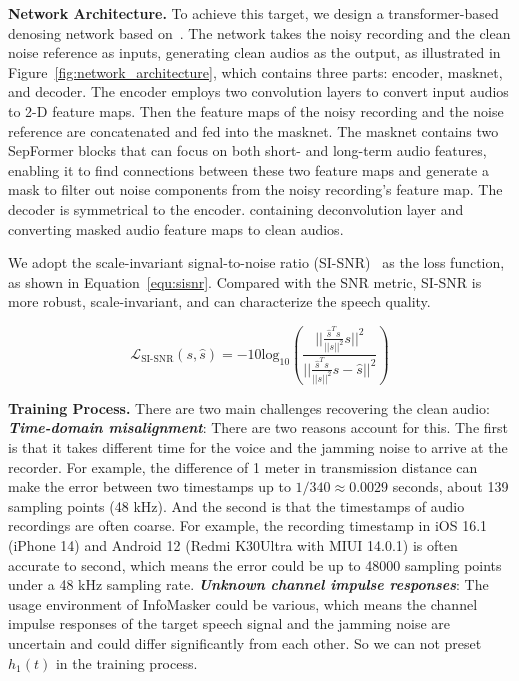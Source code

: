 \textbf{Network Architecture.} To achieve this target, we design a transformer-based denosing network based on~\cite{sepformer}. The network takes the noisy recording and the clean noise reference as inputs, generating clean audios as the output, as illustrated in Figure~\ref{fig:network_architecture}, which contains three parts: encoder, masknet, and decoder. The encoder employs two convolution layers to convert input audios to 2-D feature maps. Then the feature maps of the noisy recording and the noise reference are concatenated and fed into the masknet. The masknet contains two SepFormer blocks that can focus on both short- and long-term audio features, enabling it to find connections between these two feature maps and generate a mask to filter out noise components from the noisy recording's feature map. The decoder is symmetrical to the encoder. containing deconvolution layer and converting masked audio feature maps to clean audios.

We adopt the scale-invariant signal-to-noise ratio (SI-SNR)~\cite{si-snr} as the loss function, as shown in Equation~\ref{equ:sisnr}. Compared with the SNR metric, SI-SNR is more robust, scale-invariant, and can characterize the speech quality.

\begin{equation}
    \mathcal{L}_{\text{SI-SNR}}(s, \hat{s}) = -10 \text{log}_{10} \left( \frac{||\frac{\hat{s}^T s}{||s||^2}s||^2}{||\frac{\hat{s}^T s}{||s||^2}s - \hat{s}||^2} \right)
    \label{equ:sisnr}
\end{equation}

\textbf{Training Process.} There are two main challenges recovering the clean audio: \textbf{\textit{Time-domain misalignment}}: There are two reasons account for this. The first is that it takes different time for the voice and the jamming noise to arrive at the recorder. For example, the difference of 1 meter in transmission distance can make the error between two timestamps up to $1/340\approx0.0029$ seconds, about 139 sampling points (48 kHz). And the second is that the timestamps of audio recordings are often coarse.
For example, the recording timestamp in iOS 16.1 (iPhone 14) and Android 12 (Redmi K30Ultra with MIUI 14.0.1) is often accurate to second, which means the error could be up to 48000 sampling points under a 48 kHz sampling rate.
\textbf{\textit{Unknown channel impulse responses}}: The usage environment of InfoMasker could be various, which means the channel impulse responses of the target speech signal and the jamming noise are uncertain and could differ significantly from each other. So we can not preset $h_{1}(t)$ in the training process.

